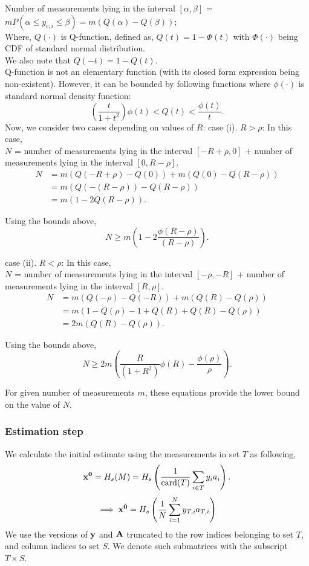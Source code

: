 Number of measurements lying in the interval $[\alpha,\beta]$ = $mP(\alpha \leq y_{c,i}\leq \beta) = m\left(Q(\alpha)- Q(\beta)\right)$; \\
Where, $Q(\cdot)$ is Q-function, defined as, $Q(t) = 1-\Phi(t)$ with $\Phi(\cdot)$ being CDF of standard normal distribution. \\
We also note that $Q(-t) = 1 - Q(t)$. \\
Q-function is not an elementary function (with its closed form expression being non-existent). However, it can be bounded by following functions where $\phi(\cdot)$ is standard normal density function:
$$
\left(\frac{t}{1+t^2}\right)\phi(t) < Q(t) < \frac{\phi(t)}{t}.
$$
Now, we consider two cases depending on values of $R$:
case (i). $R > \rho$: In this case, \\
$N$ = number of measurements lying in the interval $[-R + \rho,0]$ + number of measurements lying in the interval $[0, R-\rho]$.
\begin{align}
N &  = m\left(Q(-R+\rho)- Q(0)\right) + m\left(Q(0)- Q(R-\rho)\right) \nonumber \\
& = m\left(Q(-(R-\rho))- Q(R-\rho)\right) \nonumber \\
& = m\left(1-2Q(R-\rho)\right).
\end{align}

Using the bounds above,
$$
N \geq m \left(1-2\frac{\phi(R-\rho)}{(R-\rho)} \right).
$$

case (ii). $R < \rho$: In this case, \\
$N$ = number of measurements lying in the interval $[-\rho,-R]$ + number of measurements lying in the interval $[R,\rho]$.
\begin{align}
N & = m\left(Q(-\rho)- Q(-R)\right) + m\left(Q(R)- Q(\rho)\right) \nonumber \\
& = m\left(1 - Q(\rho)-1 +Q(R) +Q(R) -Q(\rho)\right) \nonumber \\
& = 2m\left(Q(R)-Q(\rho)\right).
\end{align}

Using the bounds above,
$$
N \geq 2m \left(\frac{R}{(1+R^2)} \phi(R) - \frac{\phi(\rho)}{\rho}\right).
$$

For given number of measurements $m$, these equations provide the lower bound on the value of $N$.
\subsubsection{Estimation step}

We calculate the initial estimate using the measurements in set $T$ as following,
$$
\mathbf{{x}^0} = H_s(M) = H_s\left(\frac{1}{\mathrm{card}(T)}\sum_{i\in T}y_{i}a_{i}\right).
$$
$$
\implies \mathbf{x^0} = H_s\left( \frac{1}{N}\sum_{i=1}^{N}y_{T,i}a_{T,i}\right)
$$
We use the versions of $\mathbf{y}$ and $\mathbf{A}$ truncated to the row indices belonging to set $T$, and column indices to set $S$. We denote such submatrices with the subscript $T\times S$. 

